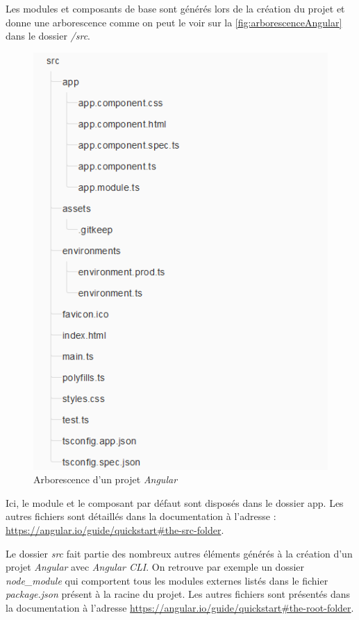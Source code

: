 \documentclass{polytech/polytech}
\begin{document}
Les modules et composants de base sont générés lors de la création du projet et donne une arborescence comme on peut le voir sur la \autoref{fig:arborescenceAngular} dans le dossier \textit{/src}.

\begin{figure}
	\includegraphics[scale=0.85]{images/arborescenceSrc}
	\caption{Arborescence d'un projet \textit{Angular}}
	\label{fig:arborescenceAngular}
\end{figure}

Ici, le module et le composant par défaut sont disposés dans le dossier app. Les autres fichiers sont détaillés dans la documentation à l’adresse : \url{https://angular.io/guide/quickstart#the-src-folder}.

Le dossier \textit{src} fait partie des nombreux autres éléments générés à la création d’un projet \textit{Angular} avec \textit{Angular CLI}. On retrouve par exemple un dossier \textit{node\_module} qui comportent tous les modules externes listés dans le fichier \textit{package.json} présent à la racine du projet. Les autres fichiers sont présentés dans la documentation à l’adresse \url{https://angular.io/guide/quickstart#the-root-folder}.
\end{document}
